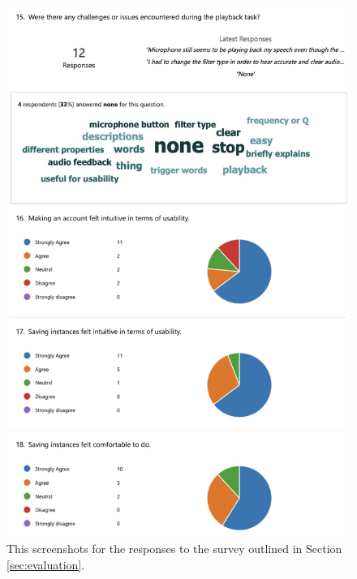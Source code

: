 \documentclass{l4proj}
\begin{document}
\begin{appendices}
\begin{figure}[H]
    \centering
    \includegraphics[width=0.75\linewidth]{dissertation/images/eval-4.jpeg}    
    \caption{This screenshots for the responses to the survey outlined in Section \ref{sec:evaluation}.}
    \label{fig:eval-survey-4} 
\end{figure}


\end{appendices}
\end{document}
